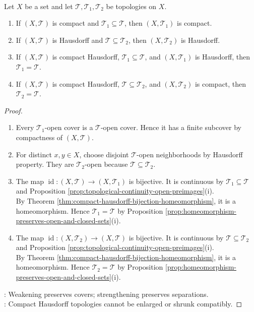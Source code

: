 \begin{proposition} \label{prop:compact-hausdorff-topology-rigidity} \\
Let $X$ be a set and let $\mathcal{T},\mathcal{T}_1,\mathcal{T}_2$ be topologies on $X$.
\begin{enumerate}[label=(\roman*)]
\setlength{\itemsep}{0pt}
\item If $(X,\mathcal{T})$ is compact and $\mathcal{T}_1\subseteq\mathcal{T}$, then $(X,\mathcal{T}_1)$ is compact.
\item If $(X,\mathcal{T})$ is Hausdorff and $\mathcal{T}\subseteq\mathcal{T}_2$, then $(X,\mathcal{T}_2)$ is Hausdorff.
\item If $(X,\mathcal{T})$ is compact Hausdorff, $\mathcal{T}_1\subseteq\mathcal{T}$, and $(X,\mathcal{T}_1)$ is Hausdorff, then $\mathcal{T}_1=\mathcal{T}$.
\item If $(X,\mathcal{T})$ is compact Hausdorff, $\mathcal{T}\subseteq\mathcal{T}_2$, and $(X,\mathcal{T}_2)$ is compact, then $\mathcal{T}_2=\mathcal{T}$.
\end{enumerate}
\begin{proof}
\begin{enumerate}[label=(\roman*)]
\setlength{\itemsep}{0pt}
\item[$(i)$] Every $\mathcal{T}_1$-open cover is a $\mathcal{T}$-open cover. Hence it has a finite subcover by compactness of $(X,\mathcal{T})$.
\item[$(ii)$] For distinct $x,y\in X$, choose disjoint $\mathcal{T}$-open neighborhoods by Hausdorff property. They are $\mathcal{T}_2$-open because $\mathcal{T}\subseteq\mathcal{T}_2$.
\item[$(iii)$] The map $\operatorname{id}:(X,\mathcal{T})\to(X,\mathcal{T}_1)$ is bijective. It is continuous by $\mathcal{T}_1\subseteq\mathcal{T}$ and Proposition \ref{prop:topological-continuity-open-preimages}(i).\\
By Theorem \ref{thm:compact-hausdorff-bijection-homeomorphism}, it is a homeomorphism. Hence $\mathcal{T}_1=\mathcal{T}$ by Proposition \ref{prop:homeomorphism-preserves-open-and-closed-sets}(i).
\item[$(iv)$] The map $\operatorname{id}:(X,\mathcal{T}_2)\to(X,\mathcal{T})$ is bijective. It is continuous by $\mathcal{T}\subseteq\mathcal{T}_2$ and Proposition \ref{prop:topological-continuity-open-preimages}(i).\\
By Theorem \ref{thm:compact-hausdorff-bijection-homeomorphism}, it is a homeomorphism. Hence $\mathcal{T}_2=\mathcal{T}$ by Proposition \ref{prop:homeomorphism-preserves-open-and-closed-sets}(i).
\end{enumerate}
: Weakening preserves covers; strengthening preserves separations.\\
: Compact Hausdorff topologies cannot be enlarged or shrunk compatibly.
\end{proof}
\end{proposition}

